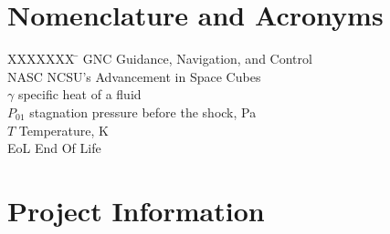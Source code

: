 \documentclass[3p]{elsarticle}
\begin{document}
\section*{Nomenclature and Acronyms}

\begin{tabbing}
  XXXXXXX \= \kill%
  GNC \> Guidance, Navigation, and Control \\
  NASC \> NCSU's Advancement in Space Cubes \\
  $\gamma$ \> specific heat of a fluid \\
  $P_{01}$ \> stagnation pressure before the shock, Pa \\
  $T$ \> Temperature, K  \\
  EoL \> End Of Life \\
  [5pt]
 \end{tabbing}
 
 \vspace{0.5mm}

\section{Project Information}
\end{document}
